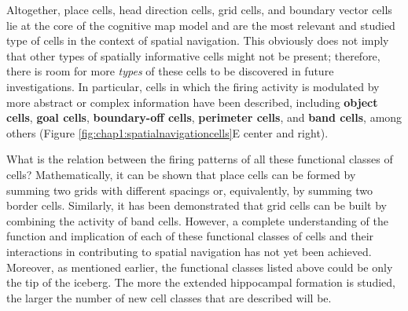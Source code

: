 Altogether, place cells, head direction cells, grid cells, and boundary vector cells lie at the core of the cognitive map model and are the most relevant and studied type of cells in the context of spatial navigation. 
This obviously does not imply that other types of spatially informative cells might not be present; therefore, there is room for more \textit{types} of these cells to be discovered in future investigations. 
In particular, cells in which the firing activity is modulated by more abstract or complex information have been described, including \textbf{object cells}, \textbf{goal cells}, \textbf{boundary-off cells}, \textbf{perimeter cells}, and \textbf{band cells}, among others (Figure \ref{fig:chap1:spatialnavigationcells}E center and right). 

What is the relation between the firing patterns of all these functional classes of cells?
Mathematically, it can be shown that place cells can be formed by summing two grids with different spacings or, equivalently, by summing two border cells. Similarly, it has been demonstrated that grid cells can be built by combining the activity of band cells. 
However, a complete understanding of the function and implication of each of these functional classes of cells and their interactions in contributing to spatial navigation has not yet been achieved. 
Moreover, as mentioned earlier, the functional classes listed above could be only the tip of the iceberg. 
The more the extended hippocampal formation is studied, the larger the number of new cell classes that are described will be. 

